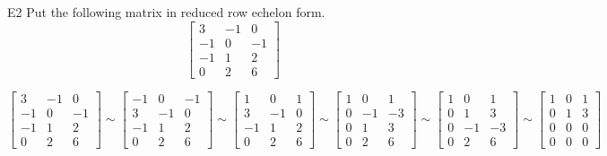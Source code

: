 \begin{problem}{E2}
Put the following matrix in reduced row echelon form.
$$\begin{bmatrix}
 3 & -1 & 0 \\
 -1 & 0 & -1 \\
 -1 & 1 & 2 \\
 0 & 2 & 6
\end{bmatrix}$$
\end{problem}
\begin{solution}
$$\begin{bmatrix}
 3 & -1 & 0 \\
 -1 & 0 & -1 \\
 -1 & 1 & 2 \\
 0 & 2 & 6
\end{bmatrix}
\sim
\begin{bmatrix}
 -1 & 0 & -1 \\
 3 & -1 & 0 \\
 -1 & 1 & 2 \\
 0 & 2 & 6
\end{bmatrix}
\sim
\begin{bmatrix}
 1 & 0 & 1 \\
 3 & -1 & 0 \\
 -1 & 1 & 2 \\
 0 & 2 & 6
\end{bmatrix}
\sim
\begin{bmatrix}
 1 & 0 & 1 \\
 0 & -1 & -3 \\
 0 & 1 & 3 \\
 0 & 2 & 6
\end{bmatrix}
\sim
\begin{bmatrix}
 1 & 0 & 1 \\
 0 & 1 & 3 \\
 0 & -1 & -3 \\
 0 & 2 & 6
\end{bmatrix}
\sim
\begin{bmatrix}
 1 & 0 & 1 \\
 0 & 1 & 3 \\
 0 & 0 & 0 \\
0 & 0 & 0
\end{bmatrix}$$
\end{solution}

